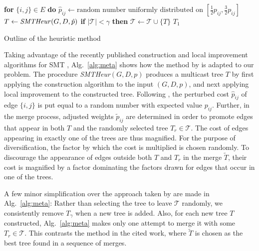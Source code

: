 \begin{algorithm}
 {
  \textbf{for} $\{i,j\}\in E$ \textbf{do} $\hat{p}_{ij}\leftarrow\text{random number uniformly distributed on
  $\left[\frac{1}{2}p_{ij},\frac{3}{2}p_{ij}\right]$}$\;
  $T\leftarrow\text{\textit{SMTHeur}$(G,D,\hat{p})$}$\;
  \textbf{if} $|\mathcal{T}|<\gamma$ \textbf{then} $\mathcal{T}\leftarrow \mathcal{T}\cup \{T\}$\;
}
\Return $T_1$

\caption{Outline of the heuristic method}
\label{alg:meta}
\end{algorithm}

Taking advantage of the recently published construction and local improvement algorithms for SMT \citep{ivanova16isco},
Alg.\ \ref{alg:meta} shows how the method by \citet{pajor18} is adapted to our problem.
The procedure \textit{SMTHeur}$(G,D,p)$ produces a multicast tree $T$ by first applying the construction algorithm to the input $(G,D,p)$,
and next applying local improvement to the constructed tree.
Following \citet{pajor18}, the perturbed cost $\hat{p}_{ij}$ of edge $\{i,j\}$ is put equal to a random number with expected value $p_{ij}$.
Further, in the merge process, adjusted weights $\tilde{p}_{ij}$ are determined in order to 
promote edges that appear in both $T$ and the randomly selected tree $T_r\in\mathcal{T}$. 
The cost of edges appearing in exactly one of the trees are thus magnified.
For the purpose of diversification, the factor by which the cost is multiplied is chosen randomly.
To discourage the appearance of edges outside both $T$ and $T_r$ in the merge $\tilde{T}$,
their cost is magnified by a factor dominating the factors drawn for edges that occur in one of the trees.

A few minor simplification over the approach taken by \citet{pajor18} are made in Alg.\ \ref{alg:meta}:
Rather than selecting the tree to leave $\mathcal{T}$ randomly, we consistently remove $T_{\gamma}$ when a new tree is added.
Also, for each new tree $T$ constructed, Alg.\ \ref{alg:meta} makes only one attempt to merge it with some $T_r\in\mathcal{T}$.
This contrasts the method in the cited work, where $\tilde{T}$ is chosen as the best tree found in a sequence of merges.

